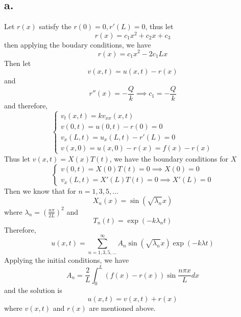\documentclass[11pt]{article}
\theoremstyle{mystyle}
\theoremstyle{definition}
\begin{document}
\subsection*{a.}
Let $r(x)$ satisfy the $r(0) = 0, r'(L) = 0$, thus let 
\[
  r(x) = c_1 x^2 + c_2x + c_3
\]
then applying the boudary conditions, we have 
\[
  r(x) = c_1 x^2 - 2c_1 Lx
\]
Then let 
\[
  v(x,t) = u(x,t) - r(x)
\]
and 
\[
  r''(x) = - \displaystyle\frac{Q}{k} \implies c_1 = -\displaystyle\frac{Q}{k}
\]
and therefore, 
\[
  \begin{cases}
    v_t(x,t) = kv_{xx}(x,t) \\
    v(0,t) = u(0,t) - r(0) = 0 \\
    v_x(L,t) = u_x(L,t) - r'(L) = 0 \\
    v(x,0) = u(x,0) - r(x) = f(x) - r(x)
  \end{cases}
\]
Thus let $v(x,t) = X(x) T(t)$, we have the boundary conditions for $X$
\[
  \begin{cases}
    v(0,t) = X(0) T(t) =0 \implies X(0) = 0 \\
    v_x(L,t) = X'(L) T(t) = 0 \implies X'(L) = 0 
  \end{cases}
\]
Then we know that for $n=1,3,5, \hdots$
\[
  X_n(x) = \sin(\sqrt{\lambda_n}x)
\]
where $\lambda_n = \left( \displaystyle\frac{n\pi}{2L}\right)^2$ and 
\[
  T_n(t) = \exp(-k \lambda_n t)
\]
Therefore, 
\[
  u(x,t) = \sum_{n=1,3,5, \hdots}^\infty A_n \sin(\sqrt{\lambda_n}x) \exp(-k \lambda t)
\]
Applying the initial conditions, we have 
\[
  A_n = \displaystyle\frac{2}{L} \int_0^L (f(x)-r(x)) \sin \displaystyle\frac{n\pi x}{L} dx
\]
and the solution is 
\[
  u(x,t) = v(x,t) + r(x)
\]
where $v(x,t)$ and $r(x)$ are mentioned above. 
\end{document}
